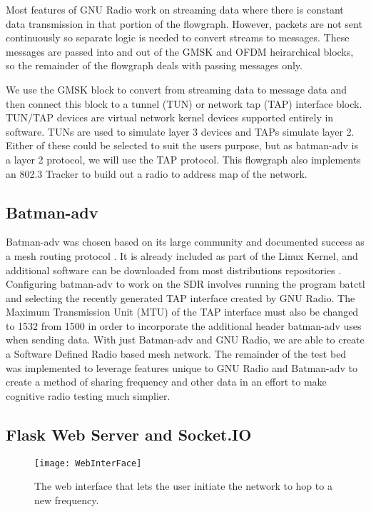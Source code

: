Most features of GNU Radio work on streaming data where there is constant data transmission in that portion of the flowgraph. However, packets are not sent continuously so separate logic is needed to convert streams to messages. These messages are passed into and out of the GMSK and OFDM heirarchical blocks, so the remainder of the flowgraph deals with passing messages only. 

We use the GMSK block to convert from streaming data to message data and then connect this block to a tunnel (TUN) or network tap (TAP) interface block. TUN/TAP devices are virtual network kernel devices supported entirely in software. TUNs are used to simulate layer 3 devices and TAPs simulate layer 2. Either of these could be selected to suit the users purpose, but as batman-adv is a layer 2 protocol, we will use the TAP protocol. This flowgraph also implements an 802.3 Tracker to build out a radio to address map of the network. 

\subsection{Batman-adv}

Batman-adv was chosen based on its large community and documented success as a mesh routing protocol \cite{5375690}. It is already included as part of the Linux Kernel, and additional software can be downloaded from most distributions repositories \cite{0008}. Configuring batman-adv to work on the SDR involves running the program batctl and selecting the recently generated TAP interface created by GNU Radio. The Maximum Transmission Unit (MTU) of the TAP interface must also be changed to 1532 from 1500 in order to incorporate the additional header batman-adv uses when sending data. With just Batman-adv and GNU Radio, we are able to create a Software Defined Radio based mesh network. The remainder of the test bed was implemented to leverage features unique to GNU Radio and Batman-adv to create a method of sharing frequency and other data in an effort to make cognitive radio testing much simplier. 

\subsection{Flask Web Server and Socket.IO}

\begin{figure}
	\centering
	\texttt{[image: WebInterFace]}
	\caption{The web interface that lets the user initiate the network to hop to a new frequency.}
	\label{fig:WebInterface}
\end{figure}

